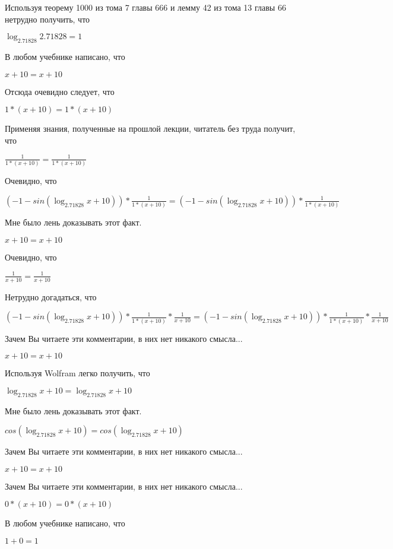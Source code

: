 \documentclass[12pt,a4paper,fleqn]{article}
\theoremstyle{definition}
\begin{document}
Используя теорему 1000 из тома 7 главы 666 и лемму 42 из тома 13 главы 66 нетрудно получить, что 

$\log_{ 2.71828 }{ 2.71828 } =  1 $

В любом учебнике написано, что 

$ x  +  10  =  x  +  10 $

Отсюда очевидно следует, что 

$ 1  * ( x  +  10 ) =  1  * ( x  +  10 )$

Применяя знания, полученные на прошлой лекции, читатель без труда получит, что 

$\frac{ 1 }{ 1  * ( x  +  10 )}
 = \frac{ 1 }{ 1  * ( x  +  10 )}
$

Очевидно, что 

$( -1  - sin(\log_{ 2.71828 }{ x  +  10 })) * \frac{ 1 }{ 1  * ( x  +  10 )}
 = ( -1  - sin(\log_{ 2.71828 }{ x  +  10 })) * \frac{ 1 }{ 1  * ( x  +  10 )}
$

Мне было лень доказывать этот факт.

$ x  +  10  =  x  +  10 $

Очевидно, что 

$\frac{ 1 }{ x  +  10 }
 = \frac{ 1 }{ x  +  10 }
$

Нетрудно догадаться, что 

$( -1  - sin(\log_{ 2.71828 }{ x  +  10 })) * \frac{ 1 }{ 1  * ( x  +  10 )}
 * \frac{ 1 }{ x  +  10 }
 = ( -1  - sin(\log_{ 2.71828 }{ x  +  10 })) * \frac{ 1 }{ 1  * ( x  +  10 )}
 * \frac{ 1 }{ x  +  10 }
$

Зачем Вы читаете эти комментарии, в них нет никакого смысла... 

$ x  +  10  =  x  +  10 $

Используя Wolfram легко получить, что 

$\log_{ 2.71828 }{ x  +  10 } = \log_{ 2.71828 }{ x  +  10 }$

Мне было лень доказывать этот факт.

$cos(\log_{ 2.71828 }{ x  +  10 }) = cos(\log_{ 2.71828 }{ x  +  10 })$

Зачем Вы читаете эти комментарии, в них нет никакого смысла... 

$ x  +  10  =  x  +  10 $

Зачем Вы читаете эти комментарии, в них нет никакого смысла... 

$ 0  * ( x  +  10 ) =  0  * ( x  +  10 )$

В любом учебнике написано, что 

$ 1  +  0  =  1 $
\end{document}
